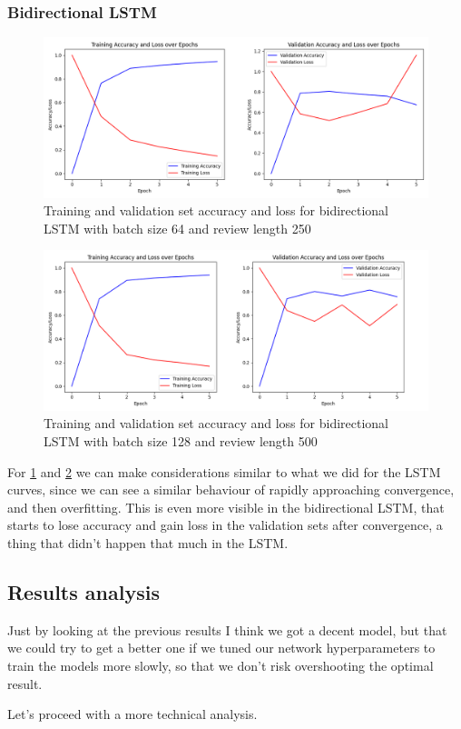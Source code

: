 \documentclass{article}
\begin{document}
\subsubsection{Bidirectional LSTM}

\begin{figure}[H]
  \centering
  \includegraphics[width=0.9\linewidth]{img/training_curves_bidirectional_64_250.png}
  \caption{Training and validation set accuracy and loss for bidirectional LSTM with batch size 64 and review length 250}
  \label{fig:training_curves_bidirectional_64_250}
\end{figure}

\begin{figure}[H]
  \centering
  \includegraphics[width=0.9\linewidth]{img/training_curves_bidirectional_128_500.png}
  \caption{Training and validation set accuracy and loss for bidirectional LSTM with batch size 128 and review length 500}
  \label{fig:training_curves_bidirectional_128_500}
\end{figure}

For \ref{fig:training_curves_bidirectional_64_250} and \ref{fig:training_curves_bidirectional_128_500} we can make considerations similar to what we did for the LSTM curves, since we can see a similar behaviour of rapidly approaching convergence, and then overfitting.
This is even more visible in the bidirectional LSTM, that starts to lose accuracy and gain loss in the validation sets after convergence, a thing that didn't happen that much in the LSTM.

\subsection{Results analysis}

Just by looking at the previous results I think we got a decent model, but that we could try to get a better one if we tuned our network hyperparameters to train the models more slowly, so that we don't risk overshooting the optimal result.

Let's proceed with a more technical analysis.





\end{document}
